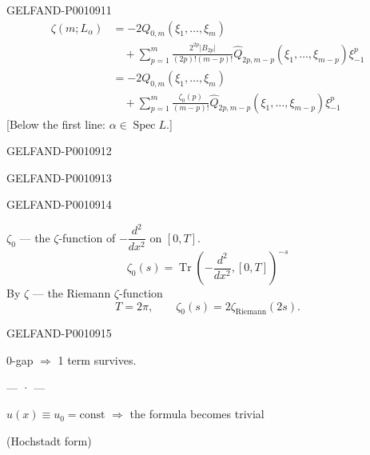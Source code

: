 \begin{GelfandAdjacentEvidence}{GELFAND-P001091}{1}
\begin{equation*}
\begin{aligned}
\zeta(m;L_\alpha)
&=-2Q_{0,m}(\xi_1,\ldots,\xi_m)\\
&\quad+\sum_{p=1}^m\frac{2^{2p}\lvert B_{2p}\rvert}{(2p)!(m-p)!}
\widehat Q_{2p,m-p}(\xi_1,\ldots,\xi_{m-p})\xi_{-1}^p\\
&=-2Q_{0,m}(\xi_1,\ldots,\xi_m)\\
&\quad+\sum_{p=1}^m\frac{\zeta_0(p)}{(m-p)!}
\widehat Q_{2p,m-p}(\xi_1,\ldots,\xi_{m-p})\xi_{-1}^p
\end{aligned}
\tag{11}
\end{equation*}
[Below the first line: $\alpha\in\operatorname{Spec}L$.]
\end{GelfandAdjacentEvidence}
\begin{GelfandAdjacentEvidence}{GELFAND-P001091}{2}

\end{GelfandAdjacentEvidence}
\begin{GelfandAdjacentEvidence}{GELFAND-P001091}{3}

\end{GelfandAdjacentEvidence}
\begin{GelfandAdjacentEvidence}{GELFAND-P001091}{4}


$\zeta_0$ — the $\zeta$-function of $-\dfrac{d^2}{dx^2}$ on $[0,T]$.
\[
\zeta_0(s)=\operatorname{Tr}\left(-\frac{d^2}{dx^2},[0,T]\right)^{-s}
\]
By $\zeta$ — the Riemann $\zeta$-function
\[
T=2\pi,\qquad\zeta_0(s)=2\zeta_{\mathrm{Riemann}}(2s).
\]
\end{GelfandAdjacentEvidence}
\begin{GelfandAdjacentEvidence}{GELFAND-P001091}{5}


0-gap $\Rightarrow$ 1 term survives.

\begin{center}— · —\end{center}

$u(x)\equiv u_0=\mathrm{const}$ $\Rightarrow$ the formula becomes trivial

(Hochstadt form)
\end{GelfandAdjacentEvidence}
